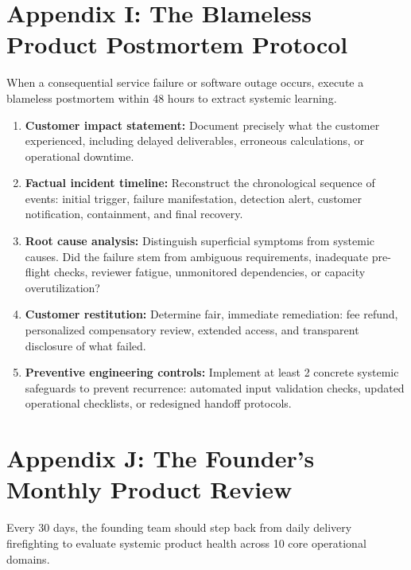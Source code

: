 \section*{Appendix I: The Blameless Product Postmortem Protocol}

When a consequential service failure or software outage occurs, execute a blameless postmortem within 48 hours to extract systemic learning.

\begin{enumerate}[leftmargin=*]
\item \textbf{Customer impact statement:} Document precisely what the customer experienced, including delayed deliverables, erroneous calculations, or operational downtime.
\item \textbf{Factual incident timeline:} Reconstruct the chronological sequence of events: initial trigger, failure manifestation, detection alert, customer notification, containment, and final recovery.
\item \textbf{Root cause analysis:} Distinguish superficial symptoms from systemic causes. Did the failure stem from ambiguous requirements, inadequate pre-flight checks, reviewer fatigue, unmonitored dependencies, or capacity overutilization?
\item \textbf{Customer restitution:} Determine fair, immediate remediation: fee refund, personalized compensatory review, extended access, and transparent disclosure of what failed.
\item \textbf{Preventive engineering controls:} Implement at least 2 concrete systemic safeguards to prevent recurrence: automated input validation checks, updated operational checklists, or redesigned handoff protocols.
\end{enumerate}

\section*{Appendix J: The Founder's Monthly Product Review}

Every 30 days, the founding team should step back from daily delivery firefighting to evaluate systemic product health across 10 core operational domains.

